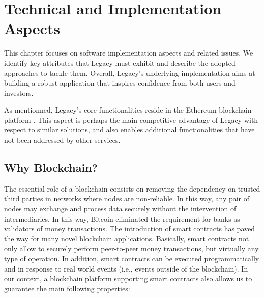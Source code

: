 \chapter{Technical and Implementation Aspects} %
\label{cha:implementation}

This chapter focuses on software implementation aspects and related issues. We identify key attributes that Legacy must exhibit and describe the adopted approaches to tackle them. Overall, Legacy’s underlying implementation aims at building a robust application that inspires confidence from both users and investors.

As mentionned, Legacy’s core functionalities reside in the Ethereum blockchain platform \cite{Ethereum}. This aspect is perhaps the main competitive advantage of Legacy with respect to similar solutions, and also enables additional functionalities that have not been addressed by other services. 

\section{Why Blockchain?} %
\label{sec:why_blockchain_}

The essential role of a blockchain consists on removing the dependency on trusted third parties in networks where nodes are non-reliable. In this way, any pair of nodes may exchange and process data securely without the intervention of intermediaries. In this way, Bitcoin eliminated the requirement for banks as validators of money transactions. The introduction of smart contracts has paved the way for many novel blockchain applications. Basically, smart contracts not only allow to securely perform peer-to-peer money transactions, but virtually any type of operation. In addition, smart contracts can be executed programmatically and in response to real world events (i.e., events outside of the blockchain). In our context, a blockchain platform supporting smart contracts also allows us to guarantee the main following properties: 

